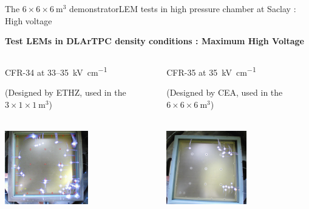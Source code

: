 \documentclass[10pt]{beamer}
\begin{document}
    \begin{frame}{The \texorpdfstring{$6 \times 6 \times \SI{6}{\meter\cubed}$}{666} demonstrator}{LEM tests in high pressure chamber at Saclay : High voltage}
    	\begin{center}
	    	\begin{scriptsize}
	    		\textbf{Test LEMs in DLArTPC density conditions : Maximum High Voltage}
	    	\end{scriptsize} 
	    \end{center}
	    \vspace{-0.5cm}
   		\begin{columns}
    		\begin{column}{0.5\textwidth}
    			\begin{center}
	    			\begin{scriptsize}
		    			CFR-34 at 33--\SI{35}{\kilo\volt\per\centi\meter}\\
		    		\end{scriptsize}
	    			\begin{tiny}
		    			(Designed by ETHZ, used in the $3 \times 1 \times \SI{1}{\meter\cubed}$)
		    		\end{tiny}\\
	    			\includegraphics[height=3.2cm]{figures/666/sparks_34.png}
    			\end{center}
    		\end{column}\hfill
    		\begin{column}{0.5\textwidth}
    			\begin{center}
	    			\begin{scriptsize}
		    			CFR-35 at \SI{35}{\kilo\volt\per\centi\meter} \\
		    		\end{scriptsize}
	    			\begin{tiny}
	    				(Designed by CEA, used in the $6 \times 6 \times \SI{6}{\meter\cubed}$)
	   				\end{tiny}\\
	    			\includegraphics[height=3.2cm]{figures/666/sparks_35.png}

\end{center}
\end{column}
\end{columns}
\end{frame}
\end{document}
